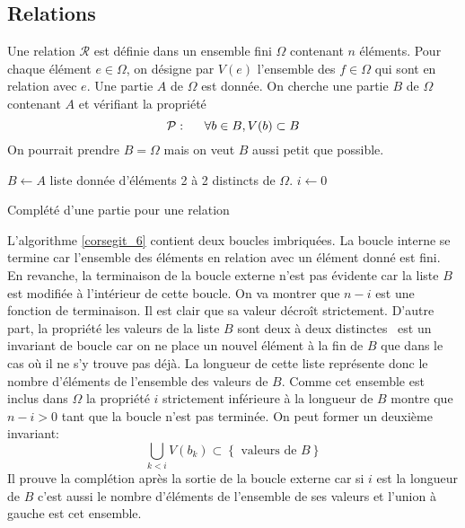 \subsection{Relations}
Une relation $\mathcal{R}$ est définie dans un ensemble fini $\Omega$ contenant $n$ éléments. Pour chaque élément $e\in \Omega$, on désigne par $V(e)$ l'ensemble des $f\in \Omega$ qui sont en relation avec $e$.\newline
Une partie $A$ de $\Omega$ est donnée. On cherche une partie $B$ de $\Omega$ contenant $A$ et vérifiant la propriété
\begin{displaymath}
  \mathcal{P}: \hspace{0.5cm} \forall b \in B, V(b) \subset B
\end{displaymath}
On pourrait prendre $B=\Omega$ mais on veut $B$ aussi petit que possible.

\begin{algorithm}
  $B \leftarrow A$ liste donnée d'éléments 2 à 2 distincts de $\Omega$.\;
  $i \leftarrow 0$\;
  \caption{Complété d'une partie pour une relation}
  \label{corsegit_6}
\end{algorithm}
L'algorithme \ref{corsegit_6} contient deux boucles imbriquées. La boucle interne se termine car l'ensemble des éléments en relation avec un élément donné est fini. En revanche, la terminaison de la boucle externe n'est pas évidente car la liste $B$ est modifiée à l'intérieur de cette boucle. \newline
On va montrer que $n-i$ est une fonction de terminaison.\newline
Il est clair que sa valeur décroît strictement.\newline
D'autre part, la propriété \og les valeurs de la liste $B$ sont deux à deux distinctes\fg~ est un invariant de boucle car on ne place un nouvel élément à la fin de $B$ que dans le cas où il ne s'y trouve pas déjà. La longueur de cette liste représente donc le nombre d'éléments de l'ensemble des valeurs de $B$. Comme cet ensemble est inclus dans $\Omega$ la propriété $i$ strictement inférieure à la longueur de $B$ montre que $n-i>0$ tant que la boucle n'est pas terminée. On peut former un deuxième invariant:
\begin{displaymath}
  \bigcup_{k< i}V(b_k) \subset \left\lbrace \text{ valeurs de }B \right\rbrace 
\end{displaymath}
Il prouve la complétion après la sortie de la boucle externe car si $i$ est la longueur de $B$ c'est aussi le nombre d'éléments de l'ensemble de ses valeurs et l'union à gauche est cet ensemble.


